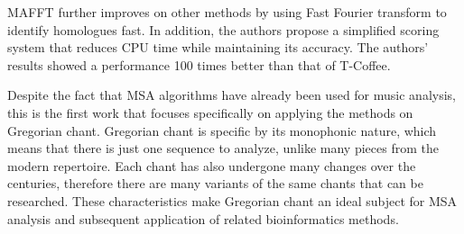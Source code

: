 MAFFT \citep{mafft} further improves on other methods by using Fast Fourier transform to identify homologues fast. In addition, the authors
propose a simplified scoring system that reduces CPU time while maintaining its accuracy. The authors' results showed a performance 
100 times better than that of T-Coffee. 

Despite the fact that MSA algorithms have already been used for music analysis, this is the first work that focuses specifically on applying
the methods on Gregorian chant. Gregorian chant is specific by its monophonic nature, which means that there is just one sequence to analyze,
unlike many pieces from the modern repertoire. Each chant has also undergone many changes over the centuries, therefore there are many variants of the same
chants that can be researched. These characteristics make Gregorian chant an ideal subject for MSA analysis and subsequent application of related
bioinformatics methods.
